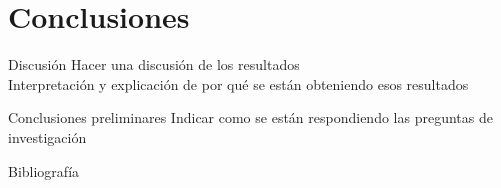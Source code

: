 \documentclass[
  24pt, %
  aspectratio=169, %
]{beamer}
\begin{document}

    

\section{Conclusiones}
\begin{frame}{Discusión}
  Hacer una discusión de los resultados\\
  Interpretación y explicación de por qué se están obteniendo esos resultados
\end{frame}
\begin{frame}{Conclusiones preliminares}
  Indicar como se están respondiendo las preguntas de investigación
\end{frame}

\begin{frame}{Bibliografía}
  \tiny
  
  
\end{frame}
\end{document}
